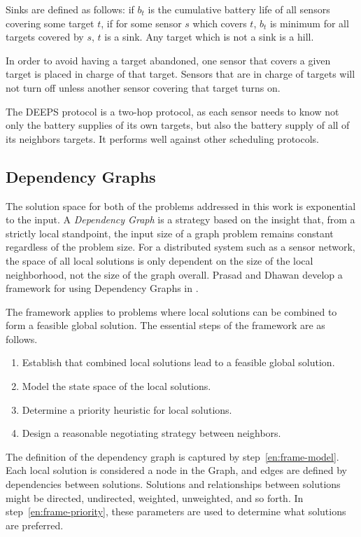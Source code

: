 Sinks are defined as follows: if $b_t$ is the cumulative battery life of all sensors covering some target $t$, if for some sensor $s$ which covers $t$, $b_t$ is minimum for all targets covered by $s$, $t$ is a sink. Any target which is not a sink is a hill.

In order to avoid having a target abandoned, one sensor that covers a given target is placed in charge of that target. Sensors that are in charge of targets will not turn off unless another sensor covering that target turns on. 

The DEEPS protocol is a two-hop protocol, as each sensor needs to know not only the battery supplies of its own targets, but also the battery supply of all of its neighbors targets. It performs well against other scheduling protocols. 

\subsection{Dependency Graphs}
\label{sec:dep-graphs}

 The solution space for both of the problems addressed in this work is exponential to the input. A {\em Dependency Graph} is a strategy based on the insight that, from a strictly local standpoint, the input size of a graph problem remains constant regardless of the problem size. For a distributed system such as a sensor network, the space of all local solutions is only dependent on the size of the local neighborhood, not the size of the graph overall\cite{978-3-540-77220-0_36}. Prasad and Dhawan develop a framework for using Dependency Graphs in \cite{IPDPS.2008.45361}.

The framework applies to problems where local solutions can be combined to form a feasible global solution. The essential steps of the framework are as follows. 
\begin{enumerate}
\item Establish that combined local solutions lead to a feasible global solution.
\item Model the state space of the local solutions. \label{en:frame-model}
\item Determine a priority heuristic for local solutions.\label{en:frame-priority}
\item Design a reasonable negotiating strategy between neighbors.
\end{enumerate} 

The definition of the dependency graph is captured by step~\ref{en:frame-model}. Each local solution is considered a node in the Graph, and edges are defined by dependencies between solutions. Solutions and relationships between solutions might be directed, undirected, weighted, unweighted, and so forth. In step~\ref{en:frame-priority}, these parameters are used to determine what solutions are preferred. 

